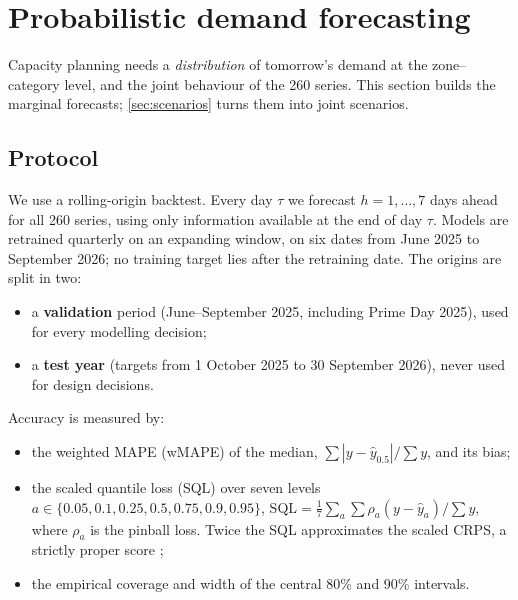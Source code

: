 \section{Probabilistic demand forecasting}\label{sec:forecasting}

Capacity planning needs a \emph{distribution} of tomorrow's demand at the zone--category level, and the joint behaviour of the 260 series.
This section builds the marginal forecasts; \cref{sec:scenarios} turns them into joint scenarios.

\subsection{Protocol}
We use a rolling-origin backtest.
Every day $\tau$ we forecast $h=1,\dots,7$ days ahead for all 260 series, using only information available at the end of day $\tau$.
Models are retrained quarterly on an expanding window, on six dates from June 2025 to September 2026; no training target lies after the retraining date.
The origins are split in two:
\begin{itemize}
  \item a \textbf{validation} period (June--September 2025, including Prime Day 2025), used for every modelling decision;
  \item a \textbf{test year} (targets from 1 October 2025 to 30 September 2026), never used for design decisions.
\end{itemize}
Accuracy is measured by:
\begin{itemize}
  \item the weighted MAPE (wMAPE) of the median, $\sum|y-\hat y_{0.5}|/\sum y$, and its bias;
  \item the scaled quantile loss (SQL) over seven levels $a\in\{0.05,0.1,0.25,0.5,0.75,0.9,0.95\}$, $\mathrm{SQL}=\frac{1}{7}\sum_a \sum \rho_a(y-\hat y_a)/\sum y$, where $\rho_a$ is the pinball loss. Twice the SQL approximates the scaled CRPS, a strictly proper score \citep{gneiting2007};
  \item the empirical coverage and width of the central 80\% and 90\% intervals.
\end{itemize}

